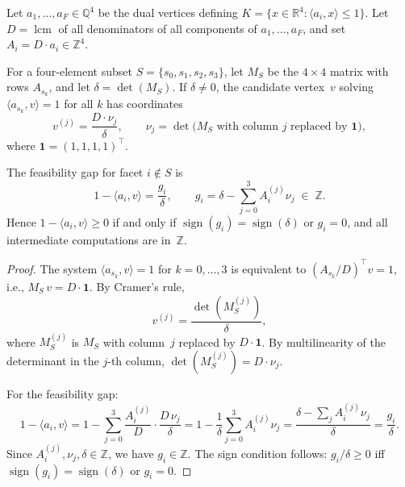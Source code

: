 \begin{unverified}
\begin{proposition}\label{prop:integer-cramer}
Let $a_1, \ldots, a_F \in \mathbb{Q}^4$ be the dual vertices defining
$K = \{x \in \mathbb{R}^4 : \langle a_i, x \rangle \leq 1\}$.
Let $D = \operatorname{lcm}$ of all denominators of all components of
$a_1, \ldots, a_F$, and set $A_i = D \cdot a_i \in \mathbb{Z}^4$.

For a four-element subset $S = \{s_0, s_1, s_2, s_3\}$, let $M_S$ be the
$4 \times 4$ matrix with rows $A_{s_k}$, and let $\delta = \det(M_S)$.
If $\delta \neq 0$, the candidate vertex~$v$ solving
$\langle a_{s_k}, v \rangle = 1$ for all $k$ has coordinates
\[
  v^{(j)} = \frac{D \cdot \nu_j}{\delta},
  \qquad
  \nu_j = \det\!\bigl(M_S \text{ with column } j
    \text{ replaced by } \mathbf{1}\bigr),
\]
where $\mathbf{1} = (1,1,1,1)^\top$.

The feasibility gap for facet $i \notin S$ is
\[
  1 - \langle a_i, v \rangle
  = \frac{g_i}{\delta},
  \qquad
  g_i = \delta - \sum_{j=0}^{3} A_i^{(j)} \nu_j \;\in\; \mathbb{Z}.
\]
Hence $1 - \langle a_i, v \rangle \geq 0$ if and only if
$\operatorname{sign}(g_i) = \operatorname{sign}(\delta)$ or $g_i = 0$,
and all intermediate computations are in~$\mathbb{Z}$.
\end{proposition}

\begin{proof}
The system $\langle a_{s_k}, v \rangle = 1$ for $k = 0, \ldots, 3$
is equivalent to $(A_{s_k}/D)^\top v = 1$, i.e.,
$M_S\, v = D \cdot \mathbf{1}$.
By Cramer's rule,
\[
  v^{(j)} = \frac{\det(M_S^{(j)})}{\delta},
\]
where $M_S^{(j)}$ is $M_S$ with column~$j$ replaced by
$D \cdot \mathbf{1}$.
By multilinearity of the determinant in the $j$-th column,
$\det(M_S^{(j)}) = D \cdot \nu_j$.

For the feasibility gap:
\[
  1 - \langle a_i, v \rangle
  = 1 - \sum_{j=0}^{3} \frac{A_i^{(j)}}{D} \cdot \frac{D\, \nu_j}{\delta}
  = 1 - \frac{1}{\delta} \sum_{j=0}^{3} A_i^{(j)} \nu_j
  = \frac{\delta - \sum_j A_i^{(j)} \nu_j}{\delta}
  = \frac{g_i}{\delta}.
\]
Since $A_i^{(j)}, \nu_j, \delta \in \mathbb{Z}$, we have $g_i \in \mathbb{Z}$.
The sign condition follows: $g_i / \delta \geq 0$ iff
$\operatorname{sign}(g_i) = \operatorname{sign}(\delta)$ or $g_i = 0$.
\end{proof}
\end{unverified}



